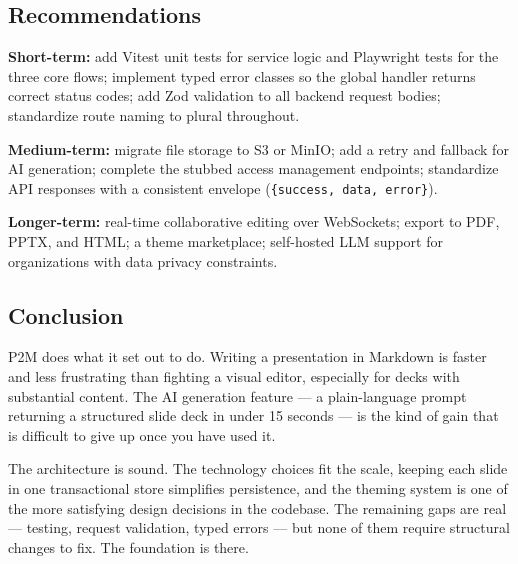 \documentclass[10pt,a4paper]{article}
\begin{document}
\subsection{Recommendations}

\textbf{Short-term:} add Vitest unit tests for service logic and Playwright tests for the three core flows; implement typed error classes so the global handler returns correct status codes; add Zod validation to all backend request bodies; standardize route naming to plural throughout.

\textbf{Medium-term:} migrate file storage to S3 or MinIO; add a retry and fallback for AI generation; complete the stubbed access management endpoints; standardize API responses with a consistent envelope (\texttt{\{success, data, error\}}).

\textbf{Longer-term:} real-time collaborative editing over WebSockets; export to PDF, PPTX, and HTML; a theme marketplace; self-hosted LLM support for organizations with data privacy constraints.

\subsection{Conclusion}

P2M does what it set out to do. Writing a presentation in Markdown is faster and less frustrating than fighting a visual editor, especially for decks with substantial content. The AI generation feature --- a plain-language prompt returning a structured slide deck in under 15 seconds --- is the kind of gain that is difficult to give up once you have used it.

The architecture is sound. The technology choices fit the scale, keeping each
slide in one transactional store simplifies persistence, and the theming system
is one of the more satisfying design decisions in the codebase. The remaining
gaps are real --- testing, request validation, typed errors --- but none of them
require structural changes to fix. The foundation is there.
\end{document}
